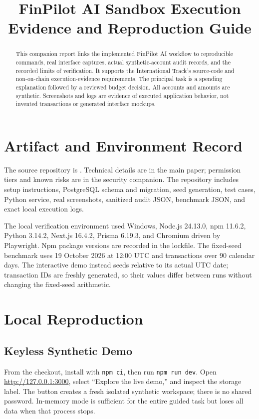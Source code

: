 \documentclass[conference,a4paper]{IEEEtran}
\title{FinPilot AI Sandbox Execution Evidence and Reproduction Guide}
\begin{document}
\maketitle
\begin{abstract}
This companion report links the implemented FinPilot AI workflow to reproducible commands, real interface captures, actual synthetic-account audit records, and the recorded limits of verification. It supports the International Track's source-code and non-on-chain execution-evidence requirements. The principal task is a spending explanation followed by a reviewed budget decision. All accounts and amounts are synthetic. Screenshots and logs are evidence of executed application behavior, not invented transactions or generated interface mockups.
\end{abstract}

\section{Artifact and Environment Record}
The source repository is \RepoLink. Technical details are in the main paper; permission tiers and known risks are in the security companion. The repository includes setup instructions, PostgreSQL schema and migration, seed generation, test cases, Python service, real screenshots, sanitized audit JSON, benchmark JSON, and exact local execution logs.

The local verification environment used Windows, Node.js 24.13.0, npm 11.6.2, Python 3.14.2, Next.js 16.4.2, Prisma 6.19.3, and Chromium driven by Playwright. Npm package versions are recorded in the lockfile. The fixed-seed benchmark uses 19 October 2026 at 12:00 UTC and \RecordedTransactions{} transactions over 90 calendar days. The interactive demo instead seeds relative to its actual UTC date; transaction IDs are freshly generated, so their values differ between runs without changing the fixed-seed arithmetic.

\section{Local Reproduction}
\subsection{Keyless Synthetic Demo}
From the checkout, install with \texttt{npm ci}, then run \texttt{npm run dev}. Open \url{http://127.0.0.1:3000}, select ``Explore the live demo,'' and inspect the storage label. The button creates a fresh isolated synthetic workspace; there is no shared password. In-memory mode is sufficient for the entire guided task but loses all data when that process stops.
\end{document}
